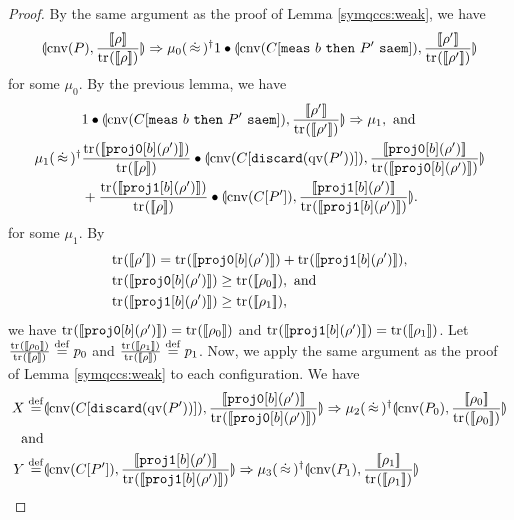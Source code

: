 \begin{proof}
 By the same argument as the proof of Lemma \ref{symqccs:weak}, we have
\begin{align*}
\con{\cnv{P}}{\frac{\braw{\rho}}{\tr{}{\braw{\rho}}}}
 \Rightarrow 
\mu_0 (\strg)^\dagger
1 \bullet \con{\cnv{C[\measure{b}{P'}]}}{\frac{\braw{\rho'}}{\tr{}{\braw{\rho'}}}}
\end{align*}
for some $\mu_0$.
By the previous lemma, we have
\begin{align*}
 &1 \bullet \con{\cnv{C[\measure{b}{P'}]}}
      {\frac{\braw{\rho'}}{\tr{}{\braw{\rho'}}}} \Rightarrow \mu_1,
\mbox{ and }\\
\mu_1 (\strg)^\dagger
 &\frac{\tr{}{\braw{\mathtt{proj0}[b](\rho')}}}{\tr{}{\braw{\rho}}}
 \bullet 
\con{\cnv{C[\mathtt{discard}(\qv{P'})]}}
{\frac{\braw{\mathtt{proj0}[b](\rho')}}
      {\tr{}{\braw{\mathtt{proj0}[b](\rho')}}}}\\
&+\frac{\tr{}{\braw{\mathtt{proj1}[b](\rho')}}}{\tr{}{\braw{\rho}}}
 \bullet
\con{\cnv{C[P']}}{\frac{\braw{\mathtt{proj1}[b](\rho')}}{\tr{}{\braw{\mathtt{proj1}[b](\rho')}}}}.
\end{align*}
for some $\mu_1$.
By
\begin{align*}
 &\tr{}{\braw{\rho'}} = \tr{}{\braw{\mathtt{proj0}[b](\rho')}} +
 \tr{}{\braw{\mathtt{proj1}[b](\rho')}},\\
 &\tr{}{\braw{\mathtt{proj0}[b](\rho')}} \ge \tr{}{\braw{\rho_0}},
 \mbox{ and}\\
 &\tr{}{\braw{\mathtt{proj1}[b](\rho')}} \ge \tr{}{\braw{\rho_1}},
\end{align*}
we have
${\rm tr}_{}([\![\mathtt{proj0}[b](\rho')]\!]) = {\rm tr}_{}([\![\rho_0]\!])$
and
${\rm tr}_{}([\![\mathtt{proj1}[b](\rho')]\!]) = {\rm tr}_{}([\![\rho_1]\!])$.
Let $\frac{{\rm tr}_{}([\![\rho_0]\!])}{{\rm tr}_{}([\![\rho]\!])} \overset{\mathrm{def}}{=}
p_0$ and 
$\frac{{\rm tr}_{}([\![\rho_1]\!])}{{\rm tr}_{}([\![\rho]\!])} \overset{\mathrm{def}}{=}
p_1$.
Now, we apply the same argument as the proof of 
Lemma \ref{symqccs:weak}
to each configuration. We have
\begin{align*}
 X \defeq &\con{\cnv{C[\mathtt{discard}(\qv{P'})]}}
{\frac{\braw{\mathtt{proj0}[b](\rho')}}
      {\tr{}{\braw{\mathtt{proj0}[b](\rho')}}}}
\Rightarrow \mu_2 (\strg)^\dagger 
\con{\cnv{P_0}}{\frac{\braw{\rho_0}}{\tr{}{\braw{\rho_0}}}}\\
\mbox{and}&\\
Y \defeq &\con{\cnv{C[P']}}
 {\frac{\braw{\mathtt{proj1}[b](\rho')}}
 {\tr{}{\braw{\mathtt{proj1}[b](\rho')}}}} 
\Rightarrow \mu_3 (\strg)^\dagger 
\con{\cnv{P_1}}{\frac{\braw{\rho_1}}{\tr{}{\braw{\rho_1}}}}

\end{align*}
\end{proof}
